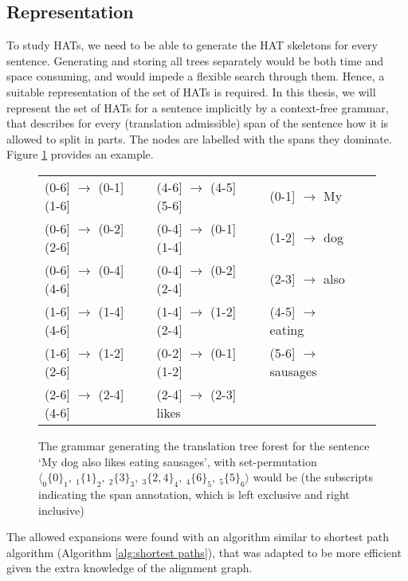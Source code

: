 \documentclass{report}
\begin{document}
\subsection{Representation}

To study HATs, we need to be able to generate the HAT skeletons for every sentence. Generating and storing all trees separately would be both time and space consuming, and would impede a flexible search through them. Hence, a suitable representation of the set of HATs is required. In this thesis, we will represent the set of HATs for a sentence implicitly by a context-free grammar, that describes for every (translation admissible) span of the sentence how it is allowed to split in parts. The nodes are labelled with the spans they dominate. Figure \ref{fig:grammar} provides an example. %

\begin{figure}[!ht]\begin{framed}
\small{
\begin{tabular}{llllll}
(0-6] $\rightarrow$ (0-1]  (1-6] && (4-6] $\rightarrow$ (4-5]  (5-6] && (0-1] $\rightarrow$ My\\
(0-6] $\rightarrow$ (0-2]  (2-6] && (0-4] $\rightarrow$ (0-1]  (1-4] && (1-2] $\rightarrow$ dog\\
(0-6] $\rightarrow$ (0-4]  (4-6] && (0-4] $\rightarrow$ (0-2]  (2-4] && (2-3] $\rightarrow$ also\\
(1-6] $\rightarrow$ (1-4]  (4-6] && (1-4] $\rightarrow$ (1-2]  (2-4] && (4-5] $\rightarrow$ eating\\
(1-6] $\rightarrow$ (1-2]  (2-6] && (0-2] $\rightarrow$ (0-1]  (1-2] && (5-6] $\rightarrow$ sausages\\
(2-6] $\rightarrow$ (2-4]  (4-6] && (2-4] $\rightarrow$ (2-3] likes\\
\end{tabular}
\caption{The grammar generating the translation tree forest for the sentence
`My dog also likes eating sausages', with set-permutation $\langle _0\{0\}_1,~ _1\{1\}_2,~ _2\{3\}_3,~ _3\{2,4\}_4, ~_4\{6\}_5,~ _5\{5\}_6\rangle$ would be (the subscripts indicating the span annotation, which is left exclusive and right inclusive)}\label{fig:grammar}
}
\end{framed}
\end{figure}

The allowed expansions were found with an algorithm similar to  shortest path algorithm (Algorithm \ref{alg:shortest paths}), that was adapted to be more efficient given the extra knowledge of the alignment graph.
\end{document}
